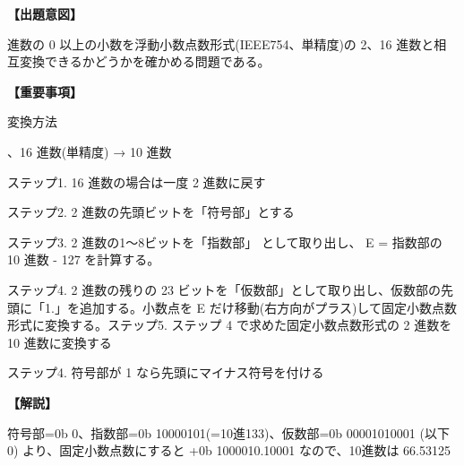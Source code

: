 \noindent \textbf{【出題意図】}

 進数の 0 以上の小数を浮動小数点数形式(IEEE754、単精度)の 2、16 進数と相互変換できるかどうかを確かめる問題である。

\vspace{1em}
\noindent \textbf{【重要事項】}

\noindent 変換方法

\medskip
{}、16 進数(単精度) → 10 進数

\noindent ステップ1.  16 進数の場合は一度 2 進数に戻す

\noindent ステップ2.  2 進数の先頭ビットを「符号部」とする

\noindent ステップ3.  2 進数の1〜8ビットを「指数部」 として取り出し、 E = 指数部の 10 進数 - 127 を計算する。

\noindent ステップ4.  2 進数の残りの 23 ビットを「仮数部」として取り出し、仮数部の先頭に「1.」を追加する。小数点を E だけ移動(右方向がプラス)して固定小数点数形式に変換する。ステップ5.  ステップ 4 で求めた固定小数点数形式の 2 進数を 10 進数に変換する

\noindent ステップ4.  符号部が 1 なら先頭にマイナス符号を付ける 


\vspace{1em}
\noindent \textbf{【解説】}

\noindent 符号部=0b 0、指数部=0b 10000101(=10進133)、仮数部=0b 00001010001 (以下0) より、固定小数点数にすると  +0b 1000010.10001 なので、10進数は 66.53125
